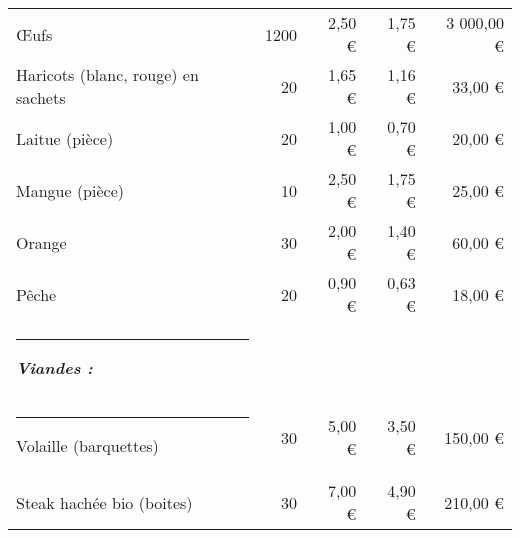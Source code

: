 \documentclass[12pt,a4paper]{report}
\begin{document}
\begin{table}[h]
\begin{tabular}{lrrrr}
					Œufs  & 1200  &                                    2,50 €  &                         1,75 €  &                           3 000,00 €  \\
					Haricots (blanc, rouge) en sachets & 20    &                                    1,65 €  &                         1,16 €  &                                 33,00 €  \\
					Laitue (pièce) & 20    &                                    1,00 €  &                         0,70 €  &                                 20,00 €  \\
					 Mangue (pièce)  & 10    &                                    2,50 €  &                         1,75 €  &                                 25,00 €  \\
					 Orange  & 30    &                                    2,00 €  &                         1,40 €  &                                 60,00 €  \\
					Pêche  & 20    &                                    0,90 €  &                         0,63 €  &                                 18,00 €  \\
					\rule[0.5cm]{-0.1cm}{0cm}
					\textit{\textbf{\color{green}Viandes :}} &       &       &   &   \\
					\rule[0.5cm]{-0.1cm}{0cm}
					 Volaille (barquettes) & 30    &                                    5,00 €  &                         3,50 €  &                               150,00 €  \\
					 Steak hachée bio (boites)  & 30    &                                    7,00 €  &                         4,90 €  &                               210,00 €  \\
					

\end{tabular}
\end{table}
\end{document}
